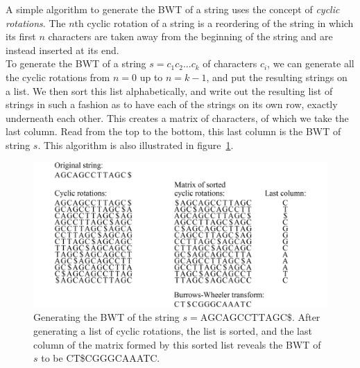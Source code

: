 \documentclass[a4paper,12pt,twoside,BCOR=10mm]{scrbook}
\begin{document}
A simple algorithm to generate the BWT of a string uses 
the concept of \textit{cyclic rotations}. 
The $ n $th cyclic rotation of a string is a reordering of the string in which its first $ n $ characters 
are taken away from the beginning of the string and are instead inserted at its end. \\
To generate the BWT of a string $ s = c_1 c_2 ... c_k $ of characters $ c_i $, 
we can generate all the cyclic rotations from $ n = 0 $ up to $ n = k - 1 $, and 
put the resulting strings on a list. 
We then sort this list alphabetically, and write out the resulting list of strings 
in such a fashion as to have each of the strings on its own row, exactly underneath each other. 
This creates a matrix of characters, of which we take the last column. 
Read from the top to the bottom, this last column is the BWT of string $ s $. 
This algorithm is also illustrated in figure~\ref{fig:evo_fig_bwt_with_cyclic_rotations}.

\begin{figure}[!htb]
\centering
\includegraphics[width=\textwidth]{evo_fig_bwt_with_cyclic_rotations.png}
\caption[Generating the BWT of a string]{Generating the BWT of the string $ s = \textrm{AGCAGCCTTAGC\$} $. After generating a list of cyclic rotations, the list is sorted, and the last column of the matrix formed by this sorted list reveals the BWT of $ s $ to be CT\$CGGGCAAATC.} \label{fig:evo_fig_bwt_with_cyclic_rotations}
\end{figure}
\end{document}
